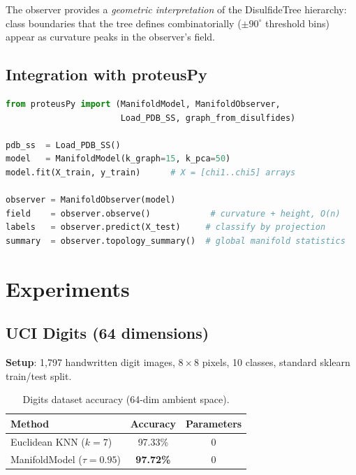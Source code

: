 \documentclass[12pt,letterpaper]{article}
\begin{document}
The observer provides a \emph{geometric interpretation} of the DisulfideTree
hierarchy: class boundaries that the tree defines combinatorially ($\pm90^\circ$
threshold bins) appear as curvature peaks in the observer's field.

\subsection{Integration with proteusPy}

\begin{lstlisting}[language=Python, caption={ManifoldObserver on the disulfide
  torsion-angle manifold (proteusPy v0.99.50).}]
from proteusPy import (ManifoldModel, ManifoldObserver,
                       Load_PDB_SS, graph_from_disulfides)

pdb_ss  = Load_PDB_SS()
model   = ManifoldModel(k_graph=15, k_pca=50)
model.fit(X_train, y_train)      # X = [chi1..chi5] arrays

observer = ManifoldObserver(model)
field    = observer.observe()            # curvature + height, O(n)
labels   = observer.predict(X_test)     # classify by projection
summary  = observer.topology_summary()  # global manifold statistics
\end{lstlisting}

\section{Experiments}

\subsection{UCI Digits (64 dimensions)}

\textbf{Setup}: 1{,}797 handwritten digit images, $8\times8$ pixels, 10 classes,
standard sklearn train/test split.

\begin{table}[h]
\centering
\caption{Digits dataset accuracy (64-dim ambient space).}
\label{tab:digits}
\begin{tabular}{lcc}
\toprule
Method & Accuracy & Parameters \\
\midrule
Euclidean KNN ($k{=}7$)      & 97.33\% & 0 \\
ManifoldModel ($\tau{=}0.95$) & \textbf{97.72\%} & 0 \\
\bottomrule
\end{tabular}
\end{table}
\end{document}
